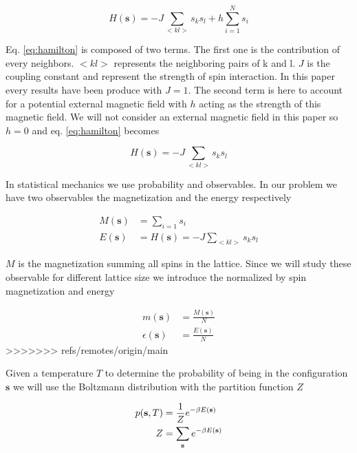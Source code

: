\documentclass[english,notitlepage,reprint,nofootinbib]{revtex4-2}  %
\begin{document}
	\begin{equation}
		H(\textbf{s}) = -J \sum_{<kl>} s_ks_l + h \sum_{i=1}^{N} s_i \label{eq:hamilton}
	\end{equation}
	
	Eq. \ref{eq:hamilton} is composed of two terms. The first one is the contribution of every 
	neighbors. $<kl>$ represents the neighboring pairs of k and l. $J$ is the coupling constant 
	and represent the strength of spin interaction. In this paper every results have been 
	produce with $J=1$. The second term is here to account for a potential external magnetic 
	field with $h$ acting as the strength of this magnetic field. We will not consider an 
	external magnetic field in this paper so $h=0$ and eq. \ref{eq:hamilton} becomes
	
	\begin{equation}
		H(\textbf{s}) = -J \sum_{<kl>} s_ks_l \label{eq:Hamiltonian}
	\end{equation}
	
	In statistical mechanics we use probability and observables. In our problem we have two 
	observables the magnetization and the energy respectively 
	
	\begin{align}
		M(\textbf{s}) &= \sum_{i=1} s_i \label{eq:M}\\
		E(\textbf{s}) &= H(\textbf{s}) = -J \sum_{<kl>} s_ks_l \label{eq:E}
	\end{align}

	$M$ is the magnetization summing all spins in the lattice. Since we will study these 
	observable for different lattice size we introduce the normalized by spin magnetization and
	energy 
	
	\begin{align}
		m(\textbf{s}) &= \frac{M(\textbf{s})}{N} \label{eq:m} \\   
		\epsilon(\textbf{s}) &= \frac{E(\textbf{s})}{N}  \label{eq:epsilon}
	\end{align}
>>>>>>> refs/remotes/origin/main

	
	Given a temperature $T$ to determine the probability of being in the configuration
	$\textbf{s}$ we will use the Boltzmann distribution with the partition function $Z$
	
	\begin{align}
		p(\textbf{s},T) &= \frac{1}{Z} e^{-\beta E(\textbf{s})} \label{eq:B_probability} \\
		Z &= \sum_{\text{\textbf{s}}} e^{-\beta E(\textbf{s})} \label{eq:partition_fun}
	\end{align}
\end{document}

